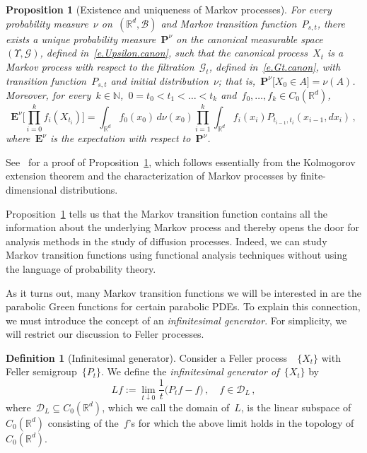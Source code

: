 \documentclass[11pt,twoside]{article} %
\numberwithin{equation}{section}
\newtheorem{proposition}[theorem]{Proposition}
\theoremstyle{definition}
\newtheorem{definition}[theorem]{Definition}
\newcommand*{\N}{\ensuremath{\mathbb{N}}}
\newcommand*{\Rd}{\ensuremath{\mathbb{R}^d}}
\begin{document}
\begin{proposition}[Existence and uniqueness of Markov processes]
\label{p.Kolmogorov}
\hspace{0.1pt}
For every probability measure~$\nu$ on~$(\Rd,\mathscr{B})$ and Markov transition function~$P_{s,t}$,  there exists a unique probability measure~$\mathbf{P}^\nu$ on the canonical measurable space~$(\Upsilon,\mathcal{G})$, defined in~\eqref{e.Upsilon.canon}, such that the canonical process~$X_t$ is a Markov process with respect to the filtration~$\mathcal{G}_t$, defined in~\eqref{e.Gt.canon}, with transition function~$P_{s,t}$ and initial distribution~$\nu$; that is,~$\mathbf{P}^\nu \bigl[ X_0 \in A \bigr] = \nu(A)$. 
Moreover, for every~$k\in\N$,~$0 = t_0 < t_1 < \ldots < t_k$ and~$f_0,\ldots, f_k \in C_0(\Rd)$, 
\begin{equation}
\label{e.finitedimdist}
\mathbf{E}^\nu\Biggl[ \prod_{i=0}^k f_i(X_{t_i}) \Biggr] 
=
\int_{\Rd} f_0(x_0)\,d\nu(x_0)
\prod_{i=1}^k
\int_{\Rd} f_i(x_i) P_{t_{i-1},t_i} (x_{i-1},dx_i)\,,
\end{equation}
where~$\mathbf{E}^\nu$ is the expectation with respect to~$\mathbf{P}^\nu$.
\end{proposition}

See~\cite[III.1.4 \& III.1.5]{RY} for a proof of Proposition~\ref{p.Kolmogorov}, which follows essentially from the Kolmogorov extension theorem and the characterization of Markov processes by finite-dimensional distributions. 

\smallskip

Proposition~\ref{p.Kolmogorov} tells us that the Markov transition function contains all the information about the underlying Markov process and thereby opens the door for analysis methods in the study of diffusion processes. Indeed, we can study Markov transition functions using functional analysis techniques without using the language of probability theory.

\smallskip

As it turns out, many Markov transition functions we will be interested in are the parabolic Green functions for certain parabolic PDEs. To explain this connection, we must introduce the concept of an \emph{infinitesimal generator}. For simplicity, we will restrict our discussion to Feller processes.

\begin{definition}[Infinitesimal generator]
Consider a Feller process~~$\{ X_t \}$ with Feller semigroup~$\{ P_t\}$.
We define the \emph{infinitesimal generator of~$\{X_t\}$} by
\begin{equation}
\label{e.generator}
L f:= 
\lim_{t \downarrow 0} 
\frac1t 
\bigl( P_t f  - f \bigr)\,, \quad f \in \mathscr{D}_L\,, 
\end{equation}
where~$\mathscr{D}_L \subseteq C_0(\Rd)$, which we call the domain of~$L$, is the linear subspace of~$C_0(\Rd)$ consisting of the~$f$'s for which the above limit holds in the topology of~$C_0(\Rd)$. 
\end{definition}
\end{document}
